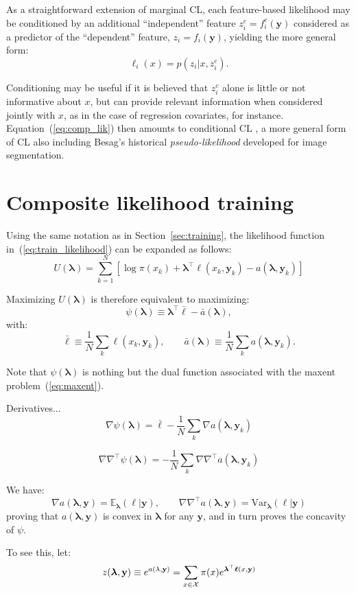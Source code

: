 \documentclass[english]{scrartcl}
\def\y{{\mathbf{y}}}
\newcommand{\blambda}{{\boldsymbol{\lambda}}}
\newcommand{\bell}{{\boldsymbol{\ell}}}
\newcommand{\E}{\mathbb{E}}
\begin{document}
As a straightforward  extension of marginal CL, each feature-based likelihood may be conditioned by an additional ``independent'' feature $z^c_i = f^c_i(\y)$ considered as a predictor of the ``dependent'' feature, $z_i=f_i(\y)$, yielding the more general form:
\begin{equation}
\label{eq:cond_feat_lik}
\ell_i(x) = p(z_i|x,z^c_i).
\end{equation}

Conditioning may be useful if it is believed that $z^c_i$ alone is little or not informative about $x$, but can provide relevant information when considered jointly with $x$, as in the case of regression covariates, for instance. Equation~(\ref{eq:comp_lik}) then amounts to conditional CL \cite{Varin-11}, a more general form of CL also including Besag's historical {\em pseudo-likelihood} \cite{Besag-74} developed for image segmentation.


\section{Composite likelihood training}
\label{appendix:training}

Using the same notation as in Section~\ref{sec:training}, the likelihood function in~(\ref{eq:train_likelihood}) can be expanded as follows:
$$
U(\blambda) 
= \sum_{k=1}^N \left[
\log \pi(x_k) + \blambda^\top \bell(x_k, \y_k) - a(\blambda,\y_k)
\right]
$$

Maximizing $U(\blambda)$ is therefore equivalent to maximizing: 
$$
\psi(\blambda) \equiv \blambda^\top \bar{\bell} - \bar{a}(\blambda), 
$$
with:
$$
\bar{\bell} \equiv \frac{1}{N} \sum_k \bell(x_k,\y_k),
\qquad
\bar{a}(\blambda) \equiv \frac{1}{N} \sum_k a(\blambda,\y_k).
$$

Note that $\psi(\blambda)$ is nothing but the dual function associated with the maxent problem~(\ref{eq:maxent}). 

Derivatives...
$$
\nabla\psi(\blambda)
= \bar{\bell} - \frac{1}{N} \sum_k \nabla a(\blambda,\y_k) 
$$

$$
\nabla\nabla^\top\psi(\blambda)
= - \frac{1}{N} \sum_k \nabla \nabla^\top a(\blambda,\y_k)  
$$

We have:
$$
\nabla a(\blambda,\y) = \E_{\blambda}(\bell|\y),
\qquad
\nabla \nabla^\top a(\blambda,\y) = \text{Var}_{\blambda}(\bell|\y)
$$
proving that $a(\blambda,\y)$ is convex in $\blambda$ for any $\y$, and in turn proves the concavity of $\psi$.

To see this, let:
$$
z(\blambda,\y) 
\equiv e^{a(\lambda,\y)}  
= \sum_{x\in{\cal X}} \pi(x) e^{\blambda^\top \bell(x,\y)}
$$
\end{document}
